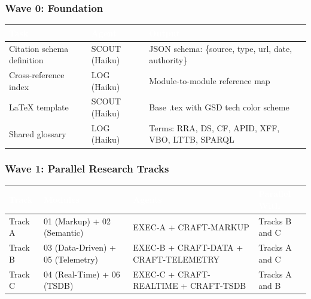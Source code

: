 \documentclass[11pt,letterpaper]{article}
\newcommand{\tableheader}[1]{\textbf{\sffamily\textcolor{white}{#1}}}
\begin{document}
\subsubsection{Wave 0: Foundation}

\begin{center}
\begin{tabularx}{\textwidth}{L{3cm}L{3cm}X}
\toprule
{}
\tableheader{Task} & \tableheader{Agent} & \tableheader{Output} \\
\midrule
Citation schema definition & SCOUT (Haiku) & JSON schema: \{source, type, url, date, authority\} \\
Cross-reference index & LOG (Haiku) & Module-to-module reference map \\
LaTeX template & SCOUT (Haiku) & Base .tex with GSD tech color scheme \\
Shared glossary & LOG (Haiku) & Terms: RRA, DS, CF, APID, XFF, VBO, LTTB, SPARQL \\
\bottomrule
\end{tabularx}
\end{center}

\subsubsection{Wave 1: Parallel Research Tracks}

\begin{center}
\begin{tabularx}{\textwidth}{L{2cm}L{3cm}L{3cm}X}
\toprule
{}
\tableheader{Track} & \tableheader{Modules} & \tableheader{Agents} & \tableheader{Parallel With} \\
\midrule
Track A & 01 (Markup) + 02 (Semantic) & EXEC-A + CRAFT-MARKUP & Tracks B and C \\
Track B & 03 (Data-Driven) + 05 (Telemetry) & EXEC-B + CRAFT-DATA + CRAFT-TELEMETRY & Tracks A and C \\
Track C & 04 (Real-Time) + 06 (TSDB) & EXEC-C + CRAFT-REALTIME + CRAFT-TSDB & Tracks A and B \\
\bottomrule
\end{tabularx}
\end{center}
\end{document}
